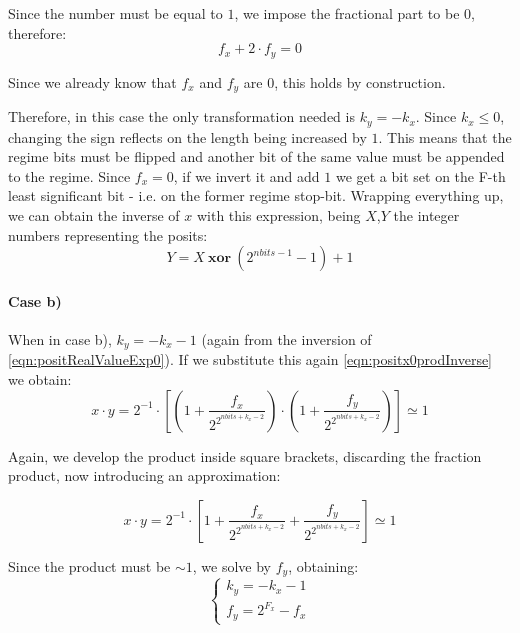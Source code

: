 Since the number must be equal to $1$, we impose the fractional part to be $0$, therefore:
\begin{equation}
    f_x + 2\cdot f_y = 0
\end{equation}

Since we already know that $f_x$ and $f_y$ are $0$, this holds by construction. 

Therefore, in this case the only transformation needed is $k_y = -k_x$. Since $k_x \leq 0$, changing the sign reflects on the length being increased by $1$. This means that the regime bits must be flipped and another bit of the same value must be appended to the regime. Since $f_x = 0$, if we invert it and add $1$ we get a bit set on the F-th least significant bit - i.e. on the former regime stop-bit. Wrapping everything up, we can obtain the inverse of $x$ with this expression, being $X$,$Y$ the integer numbers representing the posits:
\begin{equation}
    Y = X\ \mathbf{xor}\ (2^{nbits - 1} - 1) + 1
\end{equation}

\paragraph{Case b)} When in case b), $k_y = -k_x - 1$ (again from the inversion of \eqref{eqn:positRealValueExp0}). If we substitute this again \eqref{eqn:positx0prodInverse} we obtain:
\begin{equation}
    x \cdot y = 2^{-1} \cdot \left[ \left (1 + \frac{f_x}{2^{2^{nbits + k_x - 2}}} \right ) \cdot \left (1 + \frac{f_y}{2^{2^{nbits + k_x - 2}}} \right ) \right] \simeq 1
\end{equation}

Again, we develop the product inside square brackets, discarding the fraction product, now introducing an approximation:

\begin{equation}
    x \cdot y = 2^{-1} \cdot \left[ 1 + \frac{f_x}{2^{2^{nbits + k_x - 2}}}  + \frac{f_y}{2^{2^{nbits + k_x - 2}}} \right] \simeq 1
\end{equation}

Since the product must be $\sim 1$, we solve by $f_y$, obtaining:
\begin{equation}
\left\{\begin{matrix}
k_y = -k_x - 1 \\
f_y = 2^{F_x} - f_x
\end{matrix}\right.
\end{equation}

